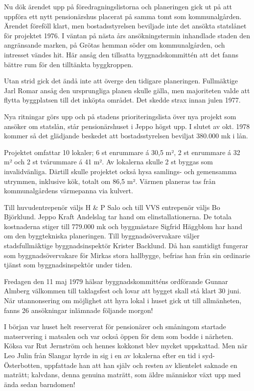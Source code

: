 Nu dök ärendet upp på föredragningslistorna och planeringen gick ut på att uppföra ett nytt pensionärshus placerat på samma tomt som kommunalgården. Ärendet föreföll klart, men bostadsstyrelsen beviljade inte det ansökta statslånet för projektet 1976. I väntan på nästa års ansökningstermin inhandlade staden den angränsande
marken, på Grötas hemman söder om kommunalgården, och intresset vändes hit. Här ansåg den tillsatta byggnadskommittén att det fanns bättre rum för den tilltänkta byggkroppen.

Utan strid gick det ändå inte att överge den tidigare planeringen. Fullmäktige Jarl Romar ansåg den ursprungliga
planen skulle gälla, men  majoriteten valde att flytta byggplatsen till det inköpta området. Det skedde strax innan julen 1977.

Nya ritningar görs upp och på stadens prioriteringslista över nya projekt som ansöker om statslån, står pensionärshuset i Jeppo högst upp. I slutet av okt. 1978 kommer så det glädjande beskedet att bostadsstyrelsen beviljat 380.000 mk i lån.

Projektet omfattar 10 lokaler;  6 st enrummare á 30,5 m², 2 st enrummare á 32 m² och 2 st tvårummare á 41 m². Av lokalerna skulle 2 st byggas som invalidvänliga. Därtill skulle projektet också hysa samlings- och gemensamma utrymmen, inklusive kök, totalt om 86,5 m². Värmen planeras tas från kommunalgårdens värmepanna via kulvert.

Till huvudentrepenör väljs H \& P Salo och till VVS entrepenör väljs Bo Björklund. Jeppo Kraft Andelslag tar hand om elinstallationerna. De totala kostnaderna stiger till 779.000 mk och byggmästare Sigfrid Häggblom har hand om den byggtekniska planeringen. Till byggnadsövervakare väljer stadsfullmäktige byggnadsinspektör Krister Backlund. Då han samtidigt fungerar som byggnadsövervakare för Mirkas stora hallbygge, befrias han från sin ordinarie tjänst som byggnadsinspektör under tiden.

Fredagen den 11 maj 1979 hälsar byggnadskommitténs ordförande Gunnar Almberg välkommen till taklagsfest och lovar att bygget skall stå klart 30 juni. När utannonsering om möjlighet att hyra lokal i huset gick ut till allmänheten, fanns 26 ansökningar inlämnade följande morgon!

I början var huset helt reserverat för pensionärer och småningom startade matservering i matsalen och var också öppen för dem som bodde i närheten. Köksa var Rut Jernström och hennes kokkonst blev mycket uppskattad. Men när Leo Julin från Slangar hyrde in sig i en av lokalerna efter en tid i syd-Österbotten, uppfattade han att han själv och resten av klientelet saknade en maträtt; kalvdans, denna genuina maträtt, som äldre människor växt  upp med ända sedan barndomen!

